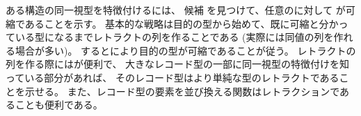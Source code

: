 \documentclass[index]{subfiles}
\begin{document}




ある構造の同一視型を特徴付けるには、
候補
を見つけて、任意のに対して
が可縮であることを示す。
基本的な戦略は目的の型から始めて、既に可縮と分かっている型になるまでレトラクトの列を作ることである
(実際には同値の列を作れる場合が多い)。
するとにより目的の型が可縮であることが従う。
レトラクトの列を作る際にはが便利で、
大きなレコード型の一部に同一視型の特徴付けを知っている部分があれば、
そのレコード型はより単純な型のレトラクトであることを示せる。
また、レコード型の要素を並び換える関数はレトラクションであることも便利である。


\end{document}
